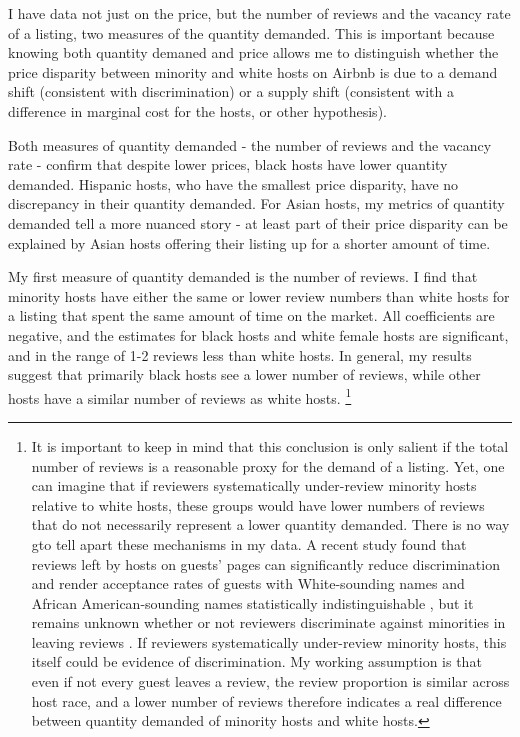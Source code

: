 I have data not just on the price, but the number of reviews and the vacancy rate of a listing, two measures of the quantity demanded. This is important because knowing both quantity demaned and price allows me to distinguish whether the price disparity between minority and white hosts on Airbnb is due to a demand shift (consistent with discrimination) or a supply shift (consistent with a difference in marginal cost for the hosts, or other hypothesis). 

Both measures of quantity demanded - the number of reviews and the vacancy rate - confirm that despite lower prices, black hosts have lower quantity demanded. Hispanic hosts, who have the smallest price disparity, have no discrepancy in their quantity demanded. For Asian hosts, my metrics of quantity demanded tell a more nuanced story - at least part of their price disparity can be explained by Asian hosts offering their listing up for a shorter amount of time. 

My first measure of quantity demanded is the number of reviews. I find that minority hosts have either the same or lower review numbers than white hosts for a listing that spent the same amount of time on the market. All coefficients are negative, and the estimates for black hosts and white female hosts are significant, and in the range of 1-2 reviews less than white hosts. In general, my results suggest that primarily black hosts see a lower number of reviews, while other hosts have a similar number of reviews as white hosts. %
	\footnote{It is important to keep in mind that this conclusion is only salient if the total number of reviews is a reasonable proxy for the demand of a listing. Yet, one can imagine that if reviewers systematically under-review minority hosts relative to white hosts, these groups would have lower numbers of reviews that do not necessarily represent a lower quantity demanded. There is no way gto tell apart these mechanisms in my data. A recent study found that reviews left by hosts on guests’ pages can significantly reduce discrimination and render acceptance rates of guests with White-sounding names and African American-sounding names statistically indistinguishable \citep{cui}, but it remains unknown whether or not reviewers discriminate against minorities in leaving reviews \citep{ye}. If reviewers systematically under-review minority hosts, this itself could be evidence of discrimination. My working assumption is that even if not every guest leaves a review, the review proportion is similar across host race, and a lower number of reviews therefore indicates a real difference between quantity demanded of minority hosts and white hosts.}
	
